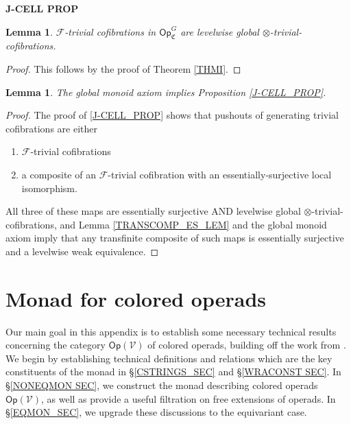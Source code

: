 \documentclass[a4paper,10pt
,draft
]{article}%
\numberwithin{equation}{section}
\numberwithin{figure}{section}
\newtheorem{lemma}[equation]{Lemma}%
\theoremstyle{definition} %
\newcommand{\Op}{\mathsf{Op}}%
\newcommand{\F}{\ensuremath{\mathcal F}}
\newcommand{\V}{\ensuremath{\mathcal V}}
\newcommand{\1}{\ensuremath{\mathbbm 1}}%
\begin{document}
{\color{blue} %

  \textbf{J-CELL PROP}
  
  \begin{lemma}
        $\F$-trivial cofibrations in $\Op^G_{\mathfrak C}$ are levelwise global $\otimes$-trivial-cofibrations.
  \end{lemma}
  \begin{proof}
        This follows by the proof of Theorem \ref{THMI}.
  \end{proof}

  \begin{lemma}
        The global monoid axiom implies Proposition \ref{J-CELL_PROP}.
  \end{lemma}
  \begin{proof}
        The proof of \ref{J-CELL_PROP} shows that pushouts of generating trivial cofibrations are either
        \begin{enumerate}
        \item $\F$-trivial cofibrations
        \item a composite of an $\F$-trivial cofibration with an essentially-surjective local isomorphism.
        \end{enumerate}
        All three of these maps are essentially surjective AND levelwise global $\otimes$-trivial-cofibrations,
        and Lemma \ref{TRANSCOMP_ES_LEM} and the global monoid axiom imply that any transfinite composite of such maps is
        essentially surjective and a levelwise weak equivalence.
  \end{proof}
} %






\appendix


\section{Monad for colored operads}
\label{MONAD_APDX}


Our main goal in this appendix is to establish some necessary technical results concerning the category $\mathsf{Op}(\mathcal{V})$ of colored operads,
building off the work from \cite{BP_geo}.
We begin by establishing technical definitions and relations which are the key constituents of the monad in \S \ref{CSTRINGS_SEC} and \S \ref{WRACONST SEC}.
In \S \ref{NONEQMON SEC}, we construct the monad describing colored operads $\Op(\V)$, as well as provide a useful filtration on free extensions of operads.
In \S \ref{EQMON_SEC}, we upgrade these discussions to the equivariant case.
\end{document}
